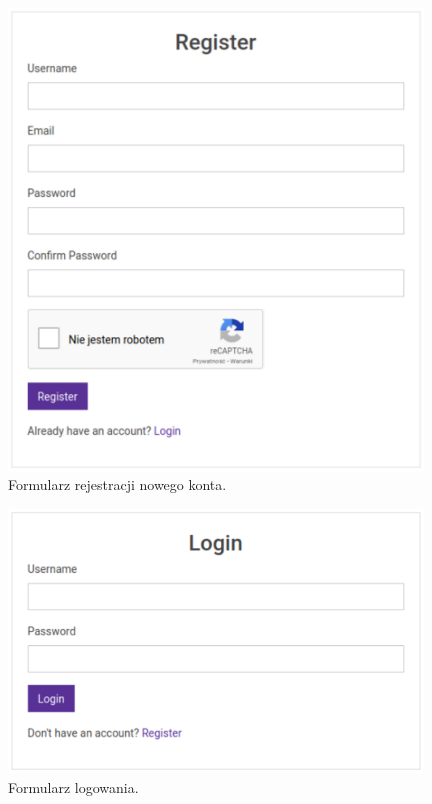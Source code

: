\begin{figure}[htb]
	\centering
	\includegraphics[width=11cm]{grafika/registery_form.eps}
	\caption{Formularz rejestracji nowego konta.}
	\label{rys8_registery_form}
\end{figure}

\begin{figure}[htb]
	\centering
	\includegraphics[width=11cm]{grafika/login_form.eps}
	\caption{Formularz logowania.}
	\label{rys9_login_form}
\end{figure}

